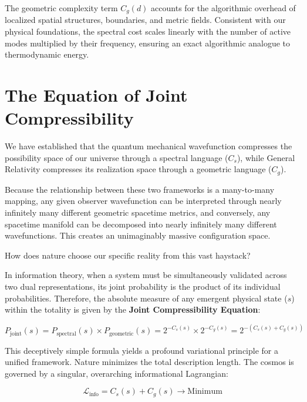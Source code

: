 The geometric complexity term $C_g(d)$ accounts for the algorithmic overhead of localized spatial structures, boundaries, and metric fields.
Consistent with our physical foundations, the spectral cost scales linearly with the number of active modes multiplied by their frequency, ensuring an exact algorithmic analogue to thermodynamic energy.



\section{The Equation of Joint Compressibility}

We have established that the quantum mechanical wavefunction compresses the possibility space of our universe through a spectral language ($C_s$), while General Relativity compresses its realization space through a geometric language ($C_g$). 

Because the relationship between these two frameworks is a many-to-many mapping, any given observer wavefunction can be interpreted through nearly infinitely many different geometric spacetime metrics, and conversely, any spacetime manifold can be decomposed into nearly infinitely many different wavefunctions.
This creates an unimaginably massive configuration space. 

How does nature choose our specific reality from this vast haystack?

In information theory, when a system must be simultaneously validated across two dual representations, its joint probability is the product of its individual probabilities.
Therefore, the absolute measure of any emergent physical state ($s$) within the totality is given by the \textbf{Joint Compressibility Equation}:

\begin{equation}
P_{\text{joint}}(s) = P_{\text{spectral}}(s) \times P_{\text{geometric}}(s) = 2^{-C_s(s)} \times 2^{-C_g(s)} = 2^{-\left(C_s(s) + C_g(s)\right)}
\end{equation}

This deceptively simple formula yields a profound variational principle for a unified framework.
Nature minimizes the total description length.
The cosmos is governed by a singular, overarching informational Lagrangian:

\begin{equation}
\label{eq:lagrangian}
\mathcal{L}_{\text{info}} = C_s(s) + C_g(s) \longrightarrow \text{Minimum}
\end{equation}

